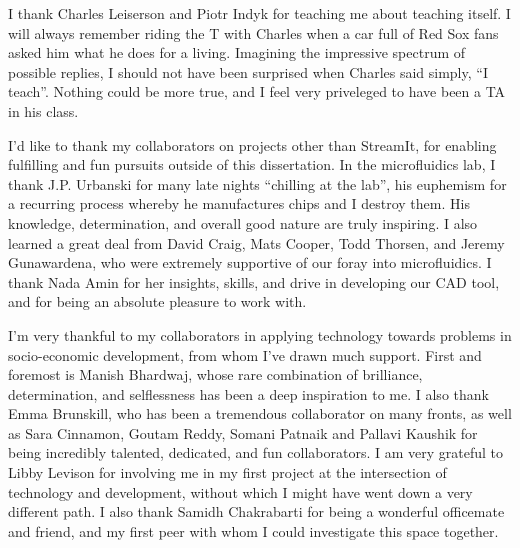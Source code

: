
I thank Charles Leiserson and Piotr Indyk for teaching me about
teaching itself.  I will always remember riding the T with Charles
when a car full of Red Sox fans asked him what he does for a living.
Imagining the impressive spectrum of possible replies, I should not
have been surprised when Charles said simply, ``I teach''.  Nothing
could be more true, and I feel very priveleged to have been a TA in
his class.

I'd like to thank my collaborators on projects other than StreamIt,
for enabling fulfilling and fun pursuits outside 
of this dissertation.  In the microfluidics lab, I thank
J.P. Urbanski for many late nights ``chilling at the lab'', his
euphemism for a recurring process whereby he manufactures chips and
I destroy them.  His knowledge, determination, and overall good
nature are truly inspiring.  I also learned a great deal from David
Craig, Mats Cooper, Todd Thorsen, and Jeremy Gunawardena, who were
extremely supportive of our foray into microfluidics.  I thank Nada
Amin for her insights, skills, and drive in developing our CAD tool,
and for being an absolute pleasure to work with.


I'm very thankful to my collaborators in applying technology towards
problems in socio-economic development, from whom I've drawn much
support.  First and foremost is Manish Bhardwaj, whose rare
combination of brilliance, determination, and selflessness has been
a deep inspiration to me.  I also thank Emma Brunskill, who has been
a tremendous collaborator on many fronts, as well as
Sara Cinnamon, Goutam Reddy, Somani Patnaik and Pallavi Kaushik for
being incredibly talented, dedicated, and fun collaborators.
%
I am very grateful to Libby Levison for involving me in my first
project at the intersection of technology and development, without
which I might have went down a very different path.  I also thank
Samidh Chakrabarti for being a wonderful officemate and friend, and
my first peer with whom I could investigate this space together.

